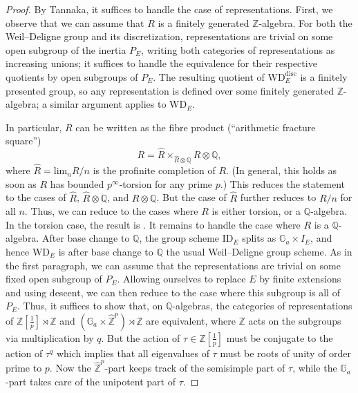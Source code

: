 \documentclass[11pt]{amsart}
\numberwithin{equation}{section}
\numberwithin{theorem}{section}
\theoremstyle{definition}
\begin{document}
\begin{proof} By Tannaka, it suffices to handle the case of representations. First, we observe that we can assume that $R$ is a finitely generated $\mathbb Z$-algebra. For both the Weil--Deligne group and its discretization, representations are trivial on some open subgroup of the inertia $P_E$, writing both categories of representations as increasing unions; it suffices to handle the equivalence for their respective quotients by open subgroups of $P_E$. The resulting quotient of $\mathrm{WD}_E^{\mathrm{disc}}$ is a finitely presented group, so any representation is defined over some finitely generated $\mathbb Z$-algebra; a similar argument applies to $\mathrm{WD}_E$.

In particular, $R$ can be written as the fibre product (``arithmetic fracture square'')
\[
R=\hat{R}\times_{\hat{R}\otimes \mathbb Q} R\otimes \mathbb Q,
\]
where $\hat{R} = \mathrm{lim}_n R/n$ is the profinite completion of $R$. (In general, this holds as soon as $R$ has bounded $p^\infty$-torsion for any prime $p$.) This reduces the statement to the cases of $\hat{R}$, $\hat{R}\otimes \mathbb Q$, and $R\otimes \mathbb Q$. But the case of $\hat{R}$ further reduces to $R/n$ for all $n$. Thus, we can reduce to the cases where $R$ is either torsion, or a $\mathbb Q$-algebra. In the torsion case, the result is \cite[proof of Theorem VIII.1.3]{FarguesScholze}. It remains to handle the case where $R$ is a $\mathbb Q$-algebra. After base change to $\mathbb Q$, the group scheme $\mathrm{ID}_E$ splits as $\mathbb G_a\times I_E$, and hence $\mathrm{WD}_E$ is after base change to $\mathbb Q$ the usual Weil--Deligne group scheme. As in the first paragraph, we can assume that the representations are trivial on some fixed open subgroup of $P_E$. Allowing ourselves to replace $E$ by finite extensions and using descent, we can then reduce to the case where this subgroup is all of $P_E$. Thus, it suffices to show that, on $\mathbb Q$-algebras, the categories of representations of $\mathbb Z[\tfrac 1p]\rtimes \mathbb Z$ and $(\mathbb G_a\times \widehat{\mathbb Z}^p)\rtimes \mathbb Z$ are equivalent, where $\mathbb Z$ acts on the subgroups via multiplication by $q$. But the action of $\tau\in \mathbb Z[\tfrac 1p]$ must be conjugate to the action of $\tau^q$ which implies that all eigenvalues of $\tau$ must be roots of unity of order prime to $p$. Now the $\widehat{\mathbb Z}^p$-part keeps track of the semisimple part of $\tau$, while the $\mathbb G_a$-part takes care of the unipotent part of $\tau$.
\end{proof}
\end{document}
